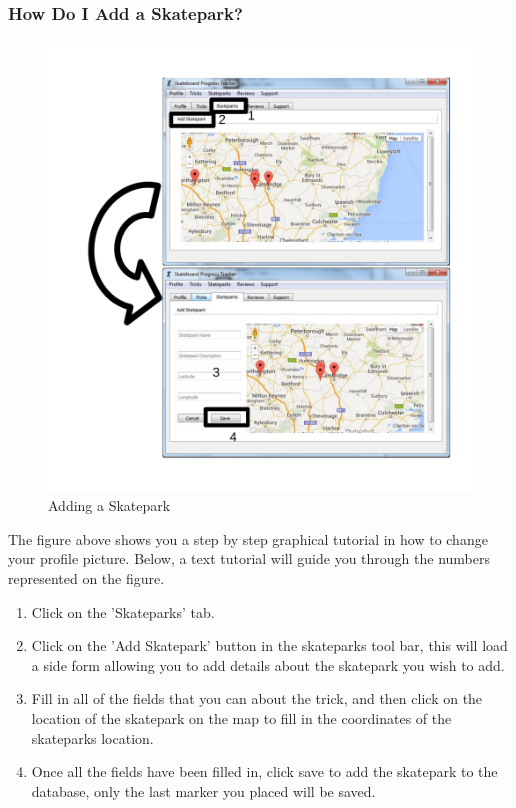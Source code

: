 \subsubsection{How Do I Add a Skatepark?}

\begin{figure}[H]
    \includegraphics[width=\textwidth]{./Manual/Images/AddSkatepark.pdf}
    \caption{Adding a Skatepark} \label{fig:Add Skatepark}
\end{figure}

The figure above shows you a step by step graphical tutorial in how to change your profile picture. Below, a text tutorial will guide you through the numbers represented on the figure.

\begin{enumerate}
\item Click on the 'Skateparks' tab.
\item Click on the 'Add Skatepark' button in the skateparks tool bar, this will load a side form allowing you to add details about the skatepark you wish to add.
\item Fill in all of the fields that you can about the trick, and then click on the location of the skatepark on the map to fill in the coordinates of the skateparks location.
\item Once all the fields have been filled in, click save to add the skatepark to the database, only the last marker you placed will be saved.
\end{enumerate}


